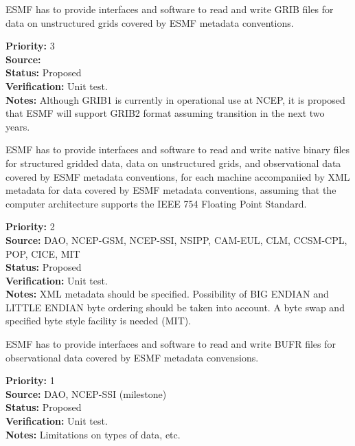 
ESMF has to provide interfaces and software to read and write GRIB
files for data on unstructured grids covered by ESMF metadata conventions.

\begin{reqlist}
{\bf Priority:} 3 \\
{\bf Source:} \\
{\bf Status:} Proposed \\
{\bf Verification:} Unit test. \\
{\bf Notes:} Although GRIB1 is currently in operational use at NCEP,
it is proposed that ESMF will support GRIB2 format assuming transition
in the next two years.
\end{reqlist}



ESMF has to provide interfaces and software to read and write native
binary files for structured gridded data, data on unstructured grids, and 
observational data  covered by ESMF metadata conventions, for each machine 
accompaniied by XML metadata for data covered by ESMF metadata conventions,
assuming that the computer architecture supports the IEEE 754 Floating
Point Standard. 

\begin{reqlist}
{\bf Priority:} 2 \\
{\bf Source:} DAO, NCEP-GSM, NCEP-SSI, NSIPP, CAM-EUL, CLM, CCSM-CPL, POP, CICE, MIT \\
{\bf Status:} Proposed \\
{\bf Verification:} Unit test. \\
{\bf Notes:} XML metadata should be specified. Possibility of BIG
ENDIAN and LITTLE ENDIAN byte ordering should be taken into account.
A byte swap and specified byte style facility is needed (MIT).
\end{reqlist}



ESMF has to provide interfaces and software to read and write BUFR files for
observational data covered by ESMF metadata convensions.

\begin{reqlist}
{\bf Priority:} 1 \\
{\bf Source:} DAO, NCEP-SSI (milestone) \\
{\bf Status:} Proposed \\
{\bf Verification:} Unit test. \\
{\bf Notes:} Limitations on types of data, etc.
\end{reqlist}



